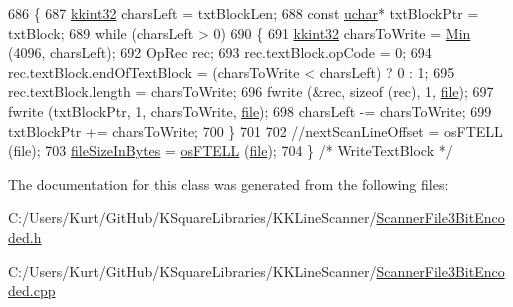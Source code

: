 \begin{DoxyCode}
686 \{
687   \hyperlink{namespace_k_k_b_a8fa4952cc84fda1de4bec1fbdd8d5b1b}{kkint32}  charsLeft = txtBlockLen;
688   \textcolor{keyword}{const} \hyperlink{namespace_k_k_b_ace9969169bf514f9ee6185186949cdf7}{uchar}*  txtBlockPtr = txtBlock;
689   \textcolor{keywordflow}{while}  (charsLeft > 0)
690   \{
691     \hyperlink{namespace_k_k_b_a8fa4952cc84fda1de4bec1fbdd8d5b1b}{kkint32}  charsToWrite = \hyperlink{_raster_8cpp_a6261a282d8ed27242c636ad5fb658585}{Min} (4096, charsLeft);
692     OpRec  rec;
693     rec.textBlock.opCode         = 0;
694     rec.textBlock.endOfTextBlock = (charsToWrite < charsLeft) ? 0 : 1;
695     rec.textBlock.length         = charsToWrite;
696     fwrite (&rec, \textcolor{keyword}{sizeof} (rec), 1, \hyperlink{class_k_k_l_s_c_1_1_scanner_file_a26db15f7823ce67b1621da17468ec807}{file});
697     fwrite (txtBlockPtr, 1, charsToWrite, \hyperlink{class_k_k_l_s_c_1_1_scanner_file_a26db15f7823ce67b1621da17468ec807}{file});
698     charsLeft -= charsToWrite;
699     txtBlockPtr += charsToWrite;
700   \}
701 
702   \textcolor{comment}{//nextScanLineOffset = osFTELL (file);}
703   \hyperlink{class_k_k_l_s_c_1_1_scanner_file_aa630f7e950cfd1cd6ecaa901f410728a}{fileSizeInBytes} = \hyperlink{namespace_k_k_b_a2cc11a5ae09d10d69ad751b549e5d94e}{osFTELL} (\hyperlink{class_k_k_l_s_c_1_1_scanner_file_a26db15f7823ce67b1621da17468ec807}{file});
704 \}  \textcolor{comment}{/* WriteTextBlock */}
\end{DoxyCode}


The documentation for this class was generated from the following files\+:\begin{DoxyCompactItemize}
\item 
C\+:/\+Users/\+Kurt/\+Git\+Hub/\+K\+Square\+Libraries/\+K\+K\+Line\+Scanner/\hyperlink{_scanner_file3_bit_encoded_8h}{Scanner\+File3\+Bit\+Encoded.\+h}\item 
C\+:/\+Users/\+Kurt/\+Git\+Hub/\+K\+Square\+Libraries/\+K\+K\+Line\+Scanner/\hyperlink{_scanner_file3_bit_encoded_8cpp}{Scanner\+File3\+Bit\+Encoded.\+cpp}\end{DoxyCompactItemize}
